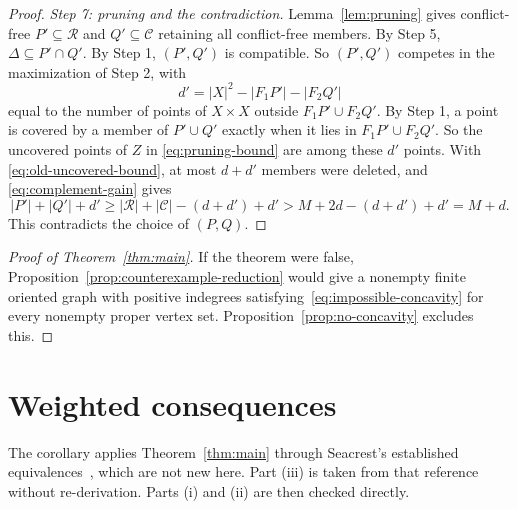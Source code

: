\documentclass[11pt]{article}
\theoremstyle{remark}
\newcommand{\abs}[1]{\lvert #1\rvert}
\begin{document}
\begin{proof}
\smallskip\noindent\emph{Step 7: pruning and the contradiction.}
Lemma~\ref{lem:pruning} gives conflict-free $P'\subseteq\mathcal R$ and
$Q'\subseteq\mathcal C$ retaining all conflict-free members.  By Step 5,
$\Delta\subseteq P'\cap Q'$.  By Step 1, $(P',Q')$ is compatible.  So
$(P',Q')$ competes in the maximization of Step 2, with
\[
 d'=\abs{X}^2-\abs{F_1P'}-\abs{F_2Q'}
\]
equal to the number of points of $X\times X$ outside $F_1P'\cup F_2Q'$.  By
Step 1, a point is covered by a member of $P'\cup Q'$ exactly when it lies
in $F_1P'\cup F_2Q'$.  So the uncovered points of $Z$ in
\eqref{eq:pruning-bound} are among these $d'$ points.  With
\eqref{eq:old-uncovered-bound}, at most $d+d'$ members were deleted, and
\eqref{eq:complement-gain} gives
\[
 \abs{P'}+\abs{Q'}+d'
 \ge \abs{\mathcal R}+\abs{\mathcal C}-(d+d')+d'
 >M+2d-(d+d')+d'=M+d.
\]
This contradicts the choice of $(P,Q)$.
\end{proof}

\begin{proof}[Proof of Theorem~\ref{thm:main}]
If the theorem were false, Proposition~\ref{prop:counterexample-reduction}
would give a nonempty finite oriented graph with positive indegrees
satisfying~\eqref{eq:impossible-concavity} for every nonempty proper vertex
set.  Proposition~\ref{prop:no-concavity} excludes this.
\end{proof}

\section{Weighted consequences}\label{sec:weighted-consequences}

The corollary applies Theorem~\ref{thm:main} through Seacrest's established
equivalences~\cite{Seacrest2015}, which are not new here.  Part (iii) is
taken from that reference without re-derivation.  Parts (i) and (ii) are
then checked directly.
\end{document}
